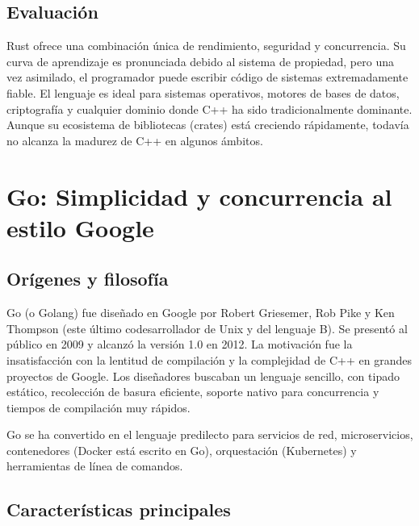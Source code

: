 \subsection{Evaluación}

Rust ofrece una combinación única de rendimiento, seguridad y concurrencia. Su curva de aprendizaje es pronunciada debido al sistema de propiedad, pero una vez asimilado, el programador puede escribir código de sistemas extremadamente fiable. El lenguaje es ideal para sistemas operativos, motores de bases de datos, criptografía y cualquier dominio donde C++ ha sido tradicionalmente dominante. Aunque su ecosistema de bibliotecas (crates) está creciendo rápidamente, todavía no alcanza la madurez de C++ en algunos ámbitos.

\section{Go: Simplicidad y concurrencia al estilo Google}

\subsection{Orígenes y filosofía}

Go (o Golang) fue diseñado en Google por Robert Griesemer, Rob Pike y Ken Thompson (este último codesarrollador de Unix y del lenguaje B). Se presentó al público en 2009 y alcanzó la versión 1.0 en 2012. La motivación fue la insatisfacción con la lentitud de compilación y la complejidad de C++ en grandes proyectos de Google. Los diseñadores buscaban un lenguaje sencillo, con tipado estático, recolección de basura eficiente, soporte nativo para concurrencia y tiempos de compilación muy rápidos.

Go se ha convertido en el lenguaje predilecto para servicios de red, microservicios, contenedores (Docker está escrito en Go), orquestación (Kubernetes) y herramientas de línea de comandos.

\subsection{Características principales}

